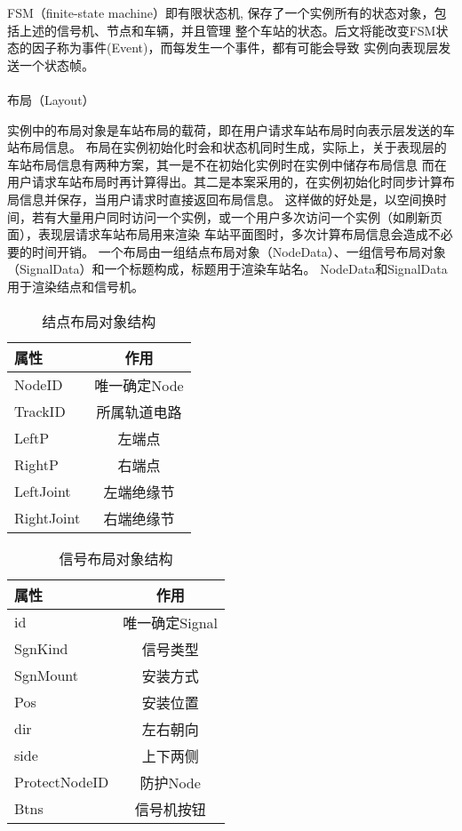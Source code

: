 FSM（finite-state machine）即有限状态机, 保存了一个实例所有的状态对象，包括上述的信号机、节点和车辆，并且管理
整个车站的状态。后文将能改变FSM状态的因子称为事件(Event)，而每发生一个事件，都有可能会导致
实例向表现层发送一个状态帧。

\paragraph{}布局（Layout）

实例中的布局对象是车站布局的载荷，即在用户请求车站布局时向表示层发送的车站布局信息。
布局在实例初始化时会和状态机同时生成，实际上，关于表现层的车站布局信息有两种方案，其一是不在初始化实例时在实例中储存布局信息
而在用户请求车站布局时再计算得出。其二是本案采用的，在实例初始化时同步计算布局信息并保存，当用户请求时直接返回布局信息。
这样做的好处是，以空间换时间，若有大量用户同时访问一个实例，或一个用户多次访问一个实例（如刷新页面），表现层请求车站布局用来渲染
车站平面图时，多次计算布局信息会造成不必要的时间开销。
一个布局由一组结点布局对象（NodeData）、一组信号布局对象（SignalData）和一个标题构成，标题用于渲染车站名。
NodeData和SignalData 用于渲染结点和信号机。

\begin{table}[htpb!]
    \centering
    \caption{\label{node_data}结点布局对象结构}
    \begin{tabular}{lc}
        \toprule
        属性       & 作用         \\
        \midrule
        NodeID     & 唯一确定Node \\
        TrackID    & 所属轨道电路 \\
        LeftP      & 左端点       \\
        RightP     & 右端点       \\
        LeftJoint  & 左端绝缘节   \\
        RightJoint & 右端绝缘节   \\
        \bottomrule
    \end{tabular}
\end{table}

\begin{table}[htpb!]
    \centering
    \caption{\label{sgn_data}信号布局对象结构}
    \begin{tabular}{lc}
        \toprule
        属性          & 作用           \\
        \midrule
        id            & 唯一确定Signal \\
        SgnKind       & 信号类型       \\
        SgnMount      & 安装方式       \\
        Pos           & 安装位置       \\
        dir           & 左右朝向       \\
        side          & 上下两侧       \\
        ProtectNodeID & 防护Node       \\
        Btns          & 信号机按钮     \\
        \bottomrule
    \end{tabular}
\end{table}

